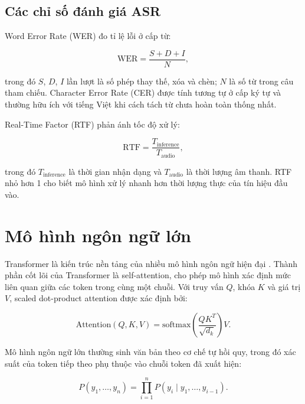 \documentclass[a4paper,13pt,oneside]{report}
\begin{document}
\subsection{Các chỉ số đánh giá ASR}

Word Error Rate (WER) đo tỉ lệ lỗi ở cấp từ:

\begin{equation}
    \mathrm{WER} = \frac{S+D+I}{N},
\end{equation}

trong đó \(S\), \(D\), \(I\) lần lượt là số phép thay thế, xóa và chèn; \(N\) là số từ trong câu tham chiếu. Character Error Rate (CER) được tính tương tự ở cấp ký tự và thường hữu ích với tiếng Việt khi cách tách từ chưa hoàn toàn thống nhất.

Real-Time Factor (RTF) phản ánh tốc độ xử lý:

\begin{equation}
    \mathrm{RTF} =
    \frac{T_{\mathrm{inference}}}{T_{\mathrm{audio}}},
\end{equation}

trong đó \(T_{\mathrm{inference}}\) là thời gian nhận dạng và \(T_{\mathrm{audio}}\) là thời lượng âm thanh. RTF nhỏ hơn 1 cho biết mô hình xử lý nhanh hơn thời lượng thực của tín hiệu đầu vào.

\section{Mô hình ngôn ngữ lớn}

Transformer là kiến trúc nền tảng của nhiều mô hình ngôn ngữ hiện đại \cite{transformer}. Thành phần cốt lõi của Transformer là self-attention, cho phép mô hình xác định mức liên quan giữa các token trong cùng một chuỗi. Với truy vấn \(Q\), khóa \(K\) và giá trị \(V\), scaled dot-product attention được xác định bởi:

\begin{equation}
    \mathrm{Attention}(Q,K,V)
    =
    \mathrm{softmax}\left(
    \frac{QK^{T}}{\sqrt{d_k}}
    \right)V.
\end{equation}

Mô hình ngôn ngữ lớn thường sinh văn bản theo cơ chế tự hồi quy, trong đó xác suất của token tiếp theo phụ thuộc vào chuỗi token đã xuất hiện:

\begin{equation}
    P(y_1,\ldots,y_n)
    =
    \prod_{i=1}^{n}P(y_i \mid y_1,\ldots,y_{i-1}).
\end{equation}
\end{document}
